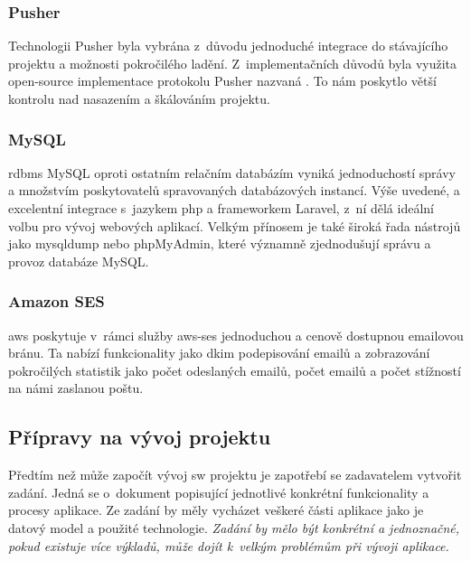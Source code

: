 \subsubsection{Pusher}

Technologii Pusher byla vybrána z~důvodu jednoduché integrace do stávajícího projektu a možnosti pokročilého ladění. Z~implementačních důvodů byla využita \gls{open-source} implementace protokolu Pusher nazvaná . To nám poskytlo větší kontrolu nad nasazením a škálováním projektu.

\subsubsection{MySQL}

\acrshort{rdbms} MySQL oproti ostatním relačním databázím vyniká jednoduchostí správy a množstvím poskytovatelů spravovaných databázových instancí\cite{mysql-vs-others}.
Výše uvedené, a excelentní integrace s~jazykem \acrshort{php} a \gls{framework}em Laravel, z~ní dělá ideální volbu pro vývoj webových aplikací.
Velkým přínosem je také široká řada nástrojů jako mysqldump\cite{mysqldump} nebo phpMyAdmin\cite{phpmyadmin}, které významně zjednodušují správu a provoz databáze MySQL.

\subsubsection{Amazon SES}

\acrfull{aws} poskytuje v~rámci služby \acrfull{aws-ses} jednoduchou a cenově dostupnou emailovou bránu. Ta nabízí funkcionality jako \gls{dkim} podepisování emailů a zobrazování pokročilých statistik jako počet odeslaných emailů, počet  emailů\cite{email-bounce} a počet stížností na námi zaslanou poštu.

\subsection{Přípravy na vývoj projektu}

Předtím než může započít vývoj \acrshort{sw} projektu je zapotřebí se zadavatelem vytvořit zadání.
Jedná se o~dokument popisující jednotlivé konkrétní funkcionality a procesy aplikace. 
Ze zadání by měly vycházet veškeré části aplikace jako je datový model a použité technologie.
\emph{Zadání by mělo být konkrétní a jednoznačné, pokud existuje více výkladů, může dojít k~velkým problémům při vývoji aplikace.} 

